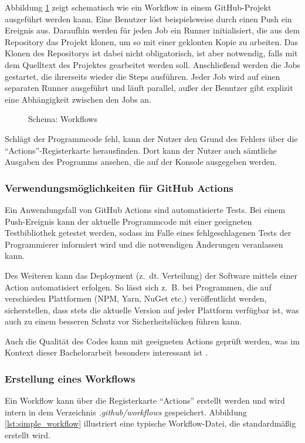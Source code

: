 Abbildung \ref{fig:workflow_schema} zeigt schematisch wie ein Workflow in einem GitHub-Projekt ausgeführt werden kann. Eine Benutzer löst beispielsweise durch einen Push ein Ereignis aus. Daraufhin werden für jeden Job ein Runner initialisiert, die aus dem Repository das Projekt klonen, um so mit einer geklonten Kopie zu arbeiten.  Das Klonen des Repositorys ist dabei nicht obligatorisch, ist aber notwendig, falls mit dem Quelltext des Projektes gearbeitet werden soll.  Anschließend werden die Jobs gestartet, die ihrerseits wieder die Steps ausführen. Jeder Job wird auf einen separaten Runner ausgeführt und läuft parallel, außer der Benutzer gibt explizit eine Abhängigkeit zwischen den Jobs an. 
\begin{figure}[ht!]
\fontsize{7}{10}\selectfont
    \centering

    \caption{Schema: Workflows}
    \label{fig:workflow_schema}
\end{figure}

Schlägt der Programmcode fehl, kann der Nutzer den Grund des Fehlers über die  \enquote{Actions}-Registerkarte herausfinden. Dort kann der Nutzer auch sämtliche Ausgaben des Programms ansehen, die auf der Konsole ausgegeben werden.

\subsubsection{Verwendungsmöglichkeiten für GitHub Actions}

Ein Anwendungsfall von GitHub Actions sind automatisierte Tests. Bei einem Push-Ereignis kann der aktuelle Programmcode mit einer geeigneten Testbibliothek getestet werden, sodass im Falle eines fehlgeschlagenen Tests der Programmierer informiert wird und die notwendigen Änderungen veranlassen kann.

Des Weiteren kann das Deployment (z.~dt. Verteilung) der Software mittels einer Action automatisiert erfolgen. So lässt sich z.~B. bei Programmen, die auf verschieden Plattformen (NPM, Yarn, NuGet etc.)  veröffentlicht werden, sicherstellen, dass stets die aktuelle Version auf jeder Plattform verfügbar ist, was auch zu einem besseren Schutz vor Sicherheitslücken führen kann. 

Auch die Qualität des Codes kann mit geeigneten Actions geprüft werden, was im Kontext dieser Bachelorarbeit besonders interessant ist \cite[S. 1ff.]{github_action_book}.  



\subsubsection{Erstellung eines Workflows}
Ein Workflow kann über die Registerkarte \enquote{Actions} erstellt werden und wird intern in dem Verzeichnis \textit{.github/workflows} gespeichert. Abbildung \ref{lst:simple_workflow} illustriert eine typische Workflow-Datei, die standardmäßig erstellt wird.


